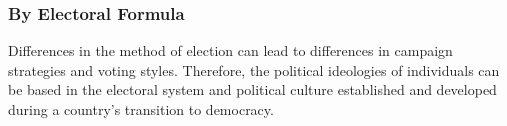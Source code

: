 \documentclass[12pt, titlepage]{article}
\newcommand\e{\emph}
\newcommand\tb{\textbf}
\begin{document}
\subsubsection{By Electoral Formula}




Differences in the method of election can lead to differences in campaign strategies and voting styles. Therefore, the political ideologies of individuals can be based in the electoral system and political culture established and developed during a country's transition to democracy. 
\end{document}
